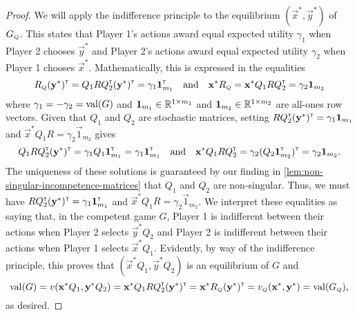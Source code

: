     \begin{proof}
        We will apply the indifference principle to the equilibrium $(\vec{x}^*, \vec{y}^*)$ of $G_\ms{Q}$.
        This states that Player 1's actions award equal expected utility $\gamma_1$ when Player 2 chooses $\vec{y}^*$ and Player 2's actions award equal expected utility $\gamma_2$ when Player 1 chooses $\vec{x}^*$.
        Mathematically, this is expressed in the equalities
        \begin{equation} \label{temp:competent-game-equilibrium-1}
            R_\ms{Q} (\vec{y}^*)^\transp
                = Q_1 R Q_2^\transp (\vec{y}^*)^\transp
                = \gamma_1 \vec{1}_{m_1}^\transp
            \quad\text{and}\quad
            \vec{x}^* R_\ms{Q}
                = \vec{x}^* Q_1 R Q_2^\transp
                = \gamma_2 \vec{1}_{m_2}
        \end{equation}
        where $\gamma_1 = -\gamma_2 = \operatorname{val}(G)$ and $\mathbf{1}_{m_1} \in \mathbb{R}^{1 \times m_1}$ and $\mathbf{1}_{m_2} \in \mathbb{R}^{1 \times m_2}$ are all-ones row vectors.
        Given that $Q_1$ and $Q_2$ are stochastic matrices, setting $R Q_2^{\scriptscriptstyle \mathsf{T}} (\mathbf{y}^*)^{\scriptscriptstyle \mathsf{T}} = \gamma_1 \mathbf{1}_{m_1}$ and $\vec{x}^* Q_1 R = \gamma_2 \vec{1}_{m_2}$ gives
        \begin{equation} \label{temp:competent-game-equilibrium-2}
            Q_1 R Q_2^{\scriptscriptstyle \mathsf{T}} (\mathbf{y}^*)^{\scriptscriptstyle \mathsf{T}}
                = \gamma_1 Q_1 \mathbf{1}_{m_1}^{\scriptscriptstyle \mathsf{T}}
                = \gamma_1 \mathbf{1}_{m_1}^{\scriptscriptstyle \mathsf{T}}
            \quad\text{and}\quad
            \mathbf{x}^* Q_1 R Q_2^{\scriptscriptstyle \mathsf{T}}
                = \gamma_2 (Q_2 \mathbf{1}_{m_2}^{\scriptscriptstyle \mathsf{T}})^{\scriptscriptstyle \mathsf{T}}
                = \gamma_2 \mathbf{1}_{m_2}.
        \end{equation}
        The uniqueness of these solutions is guaranteed by our finding in \autoref{lem:non-singular-incompetence-matrices} that $Q_1$ and $Q_2$ are non-singular.
        Thus, we must have $R Q_2^{\scriptscriptstyle \mathsf{T}} (\mathbf{y}^*)^{\scriptscriptstyle \mathsf{T}} = \gamma_1 \mathbf{1}_{m_1}^{\scriptscriptstyle \mathsf{T}}$ and $\vec{x}^* Q_1 R = \gamma_2 \vec{1}_{m_2}$.
        We interpret these equalities as saying that, in the competent game $G$, Player 1 is indifferent between their actions when Player 2 selects $\vec{y}^* Q_2$ and Player 2 is indifferent between their actions when Player 1 selects $\vec{x}^* Q_1$.
        Evidently, by way of the indifference principle, this proves that $(\vec{x}^* Q_1, \vec{y}^* Q_2)$ is an equilibrium of $G$ and
        \begin{equation} \label{eq:temp:competent-game-equilibrium-3}
            \val(G)
                = v(\vec{x}^* Q_1, \vec{y}^* Q_2)
                = \vec{x}^* Q_1 R Q_2^\transp (\vec{y}^*)^\transp
                = \vec{x}^* R_\ms{Q} (\vec{y}^*)^\transp
                = v_\ms{Q}(\vec{x}^*, \vec{y}^*)
                = \val(G_\ms{Q}),
        \end{equation}
        as desired.
    \end{proof}

